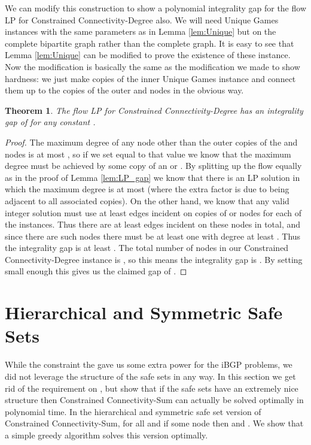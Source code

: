 \documentclass[11pt,letterpaper]{article}
\newtheorem{theorem}{Theorem}[section]
\theoremstyle{definition}
\begin{document}
We can modify this construction to show a polynomial integrality gap for the flow LP for {\sc Constrained Connectivity-Degree} also.  We will need Unique Games instances with the same parameters as in Lemma \ref{lem:Unique} but on the complete bipartite graph rather than the complete graph.  It is easy to see that Lemma \ref{lem:Unique} can be modified to prove the existence of these instance.  Now the modification is basically the same as the modification we made to show hardness: we just make  copies of the inner Unique Games instance and connect them up to the  copies of the outer  and  nodes in the obvious way.

\begin{theorem} \label{thm:degree_gap}
The flow LP for {\sc Constrained Connectivity-Degree} has an integrality gap of  for any constant .
\end{theorem}
\begin{proof}
The maximum degree of any node other than the outer  copies of the  and  nodes is at most , so if we set  equal to that value we know that the maximum degree must be achieved by some copy of an  or .  By splitting up the flow equally as in the proof of Lemma \ref{lem:LP_gap} we know that there is an LP solution in which the maximum degree is at most  (where the extra  factor is due to being adjacent to all associated  copies).  On the other hand, we know that any valid integer solution must use at least  edges incident on copies of  or  nodes for each of the  instances.  Thus there are at least  edges incident on these nodes in total, and since there are  such nodes there must be at least one with degree at least .  Thus the integrality gap is at least .  The total number of nodes in our {\sc Constrained Connectivity-Degree} instance is , so this means the integrality gap is .  By setting  small enough this gives us the claimed gap of .
\end{proof}






\section{Hierarchical and Symmetric Safe Sets} \label{sec:hierarchical}

While the constraint the  gave us some extra power for the iBGP problems, we did not leverage the structure of the safe sets in any way.  In this section we get rid of the requirement on , but show that if the safe sets have an extremely nice structure then {\sc Constrained Connectivity-Sum} can actually be solved optimally in polynomial time.  In the
hierarchical and symmetric safe set version of {\sc Constrained Connectivity-Sum},  for all  and
if some node  then  and .  We show that a simple greedy algorithm solves this
version optimally.
\end{document}
